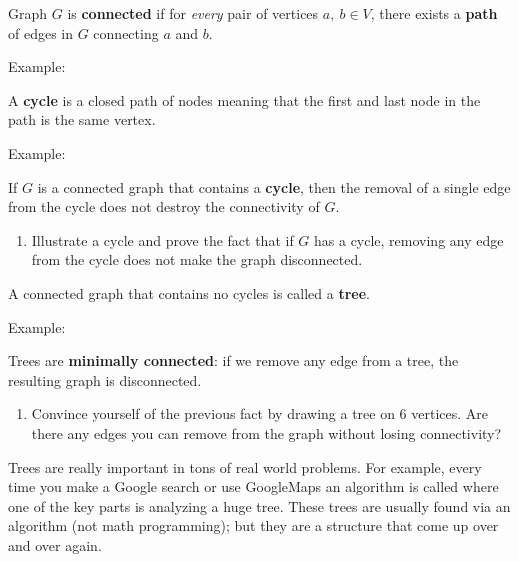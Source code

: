 \documentclass[11pt]{article}
\theoremstyle{definition}
\begin{document}
\newpage


\begin{tcolorbox}
Graph $G$ is \textbf{connected} if for \emph{every} pair of vertices $a,~b \in V$, there exists a \textbf{path} of edges in $G$ connecting $a$ and $b$.  
\end{tcolorbox}

Example: \vspace{2in}

\begin{tcolorbox}
A \textbf{cycle} is a closed path of nodes meaning that the first and last node in the path is the same vertex.
\end{tcolorbox}

Example: \vspace{2in}

\begin{tcolorbox}
If $G$ is a connected graph that contains a \textbf{cycle}, then the removal of a single edge from the cycle does not destroy the connectivity of $G$.
\end{tcolorbox}

\begin{enumerate}[resume]
\item Illustrate a cycle and prove the fact that if $G$ has a cycle, removing any edge from the cycle does not make the graph disconnected.
\end{enumerate}

\newpage



\begin{tcolorbox}
A connected graph that contains no cycles is called a \textbf{tree}.  
\end{tcolorbox}
Example: \vspace{3in}

\begin{tcolorbox}
Trees are \textbf{minimally connected}:  if we remove any edge from a tree, the resulting graph is disconnected.
\end{tcolorbox}
\begin{enumerate}[resume]
\item Convince yourself of the previous fact by drawing a tree on 6 vertices.  Are there any edges you can remove from the graph without losing connectivity?
\end{enumerate}

\vfill

\begin{tcolorbox}
Trees are really important in tons of real world problems. For example, every time you make a Google search or use GoogleMaps an algorithm is called where one of the key parts is analyzing a huge tree. These trees are usually found via an algorithm (not math programming); but they are a structure that come up over and over again.
\end{tcolorbox}
\end{document}
